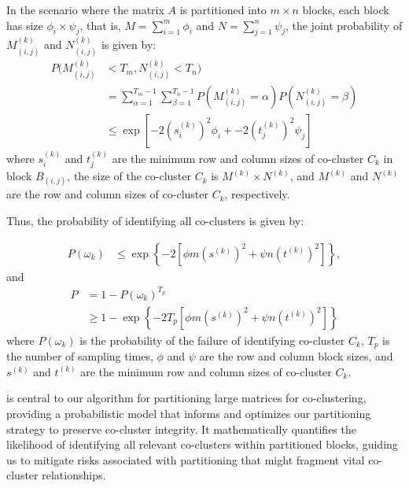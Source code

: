 \documentclass[journal]{IEEEtran}
\begin{document}
In the scenario where the matrix $A$ is partitioned into $m \times n$ blocks, each block has size $\phi_i \times \psi_j$, that is, $M=\sum_{i=1}^m \phi_i$ and $N=\sum_{j=1}^n \psi_j$, the joint probability of $M_{(i,j)}^{(k)}$ and $N_{(i,j)}^{(k)}$ is given by:
\begin{align*}
  P(M_{(i,j)}^{(k)} & < T_m, N_{(i,j)}^{(k)} < T_n)                                                                           \\
                    & = \sum_{\alpha=1}^{T_m-1} \sum_{\beta=1}^{T_n-1} P(M_{(i,j)}^{(k)} = \alpha) P(N_{(i,j)}^{(k)} = \beta) \\
                    & \le \exp[-2 (s_i^{(k)})^2 \phi_i + -2 (t_j^{(k)})^2 \psi_j]
\end{align*}
where $s_i^{(k)}$ and $t_j^{(k)}$ are the minimum row and column sizes of co-cluster $C_k$ in block $B_{(i,j)}$, the size of the co-cluster $C_k$ is $M^{(k)} \times N^{(k)}$, and $M^{(k)}$ and $N^{(k)}$ are the row and column sizes of co-cluster $C_k$, respectively.

Thus, the probability of identifying all co-clusters is given by:

\begin{align}
  P(\omega_k) & \le \exp \left\{ -2 [\phi m (s^{(k)})^2 + \psi n (t^{(k)})^2] \right\},
\end{align}
and
\begin{align}
  P & = 1 - P(\omega_k)^{T_p}                                                                                                       \\
    & \ge 1 - \exp \left\{ -2 T_p [\phi m (s^{(k)})^2 + \psi n (t^{(k)})^2] \right\} \label{eq:prob_of_identifying_all_co_clusters}
\end{align}
where $P(\omega_k)$ is the probability of the failure of identifying co-cluster $C_k$, $T_p$ is the number of sampling times, $\phi$ and $\psi$ are the row and column block sizes, and $s^{(k)}$ and $t^{(k)}$ are the minimum row and column sizes of co-cluster $C_k$.

 is central to our algorithm for partitioning large matrices for co-clustering, providing a probabilistic model that informs and optimizes our partitioning strategy to preserve co-cluster integrity. It mathematically quantifies the likelihood of identifying all relevant co-clusters within partitioned blocks, guiding us to mitigate risks associated with partitioning that might fragment vital co-cluster relationships.
\end{document}
